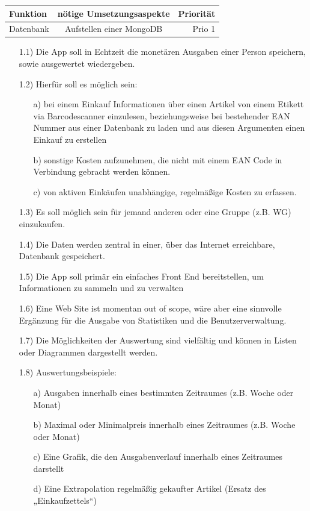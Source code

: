 \documentclass[12pt,a4paper]{article}
\begin{document}
\begin{tabular}{|l|c|r|}
\hline
 Funktion & nötige Umsetzungsaspekte & Priorität \\
\hline
Datenbank & Aufstellen einer MongoDB & Prio 1\\
\end{tabular}

\begin{itemize}
 \item[1.1)] 
  Die App soll in Echtzeit die monetären Ausgaben einer Person speichern, sowie ausgewertet wiedergeben.
 \item[1.2)] Hierfür soll es möglich sein:
 \begin{itemize}
 \item[a)] bei einem Einkauf Informationen über einen Artikel von einem Etikett via Barcodescanner einzulesen, beziehungsweise bei bestehender EAN Nummer aus einer Datenbank zu laden und aus diesen Argumenten einen Einkauf zu erstellen
  \item[b)] sonstige Kosten aufzunehmen, die nicht mit einem EAN Code in Verbindung gebracht werden können.
  \item[c)] von aktiven Einkäufen unabhängige, regelmäßige Kosten zu erfassen.
  \end{itemize}
 \item[1.3)] Es soll möglich sein für jemand anderen oder eine Gruppe (z.B. WG) einzukaufen.
 \item[1.4)] Die Daten werden zentral in einer, über das Internet erreichbare, Datenbank gespeichert.
 \item[1.5)] Die App soll primär ein einfaches Front End bereitstellen, um Informationen zu sammeln und zu verwalten
 \item[1.6)] Eine Web Site ist momentan out of scope, wäre aber eine sinnvolle Ergänzung für die Ausgabe von Statistiken und die Benutzerverwaltung.
 \item[1.7)] Die Möglichkeiten der Auswertung sind vielfältig und können in Listen oder Diagrammen dargestellt werden.
 \item[1.8)] Auswertungsbeispiele:
 \begin{itemize}
\item[a)]Ausgaben innerhalb eines bestimmten Zeitraumes (z.B. Woche oder Monat)
 \item[b)] Maximal oder Minimalpreis innerhalb eines Zeitraumes (z.B. Woche oder Monat) 
\item[c)] Eine Grafik, die den Ausgabenverlauf innerhalb eines Zeitraumes darstellt
\item[d)] Eine Extrapolation regelmäßig gekaufter Artikel (Ersatz des „Einkaufzettels“)

\end{itemize}
\end{itemize}
\end{document}

